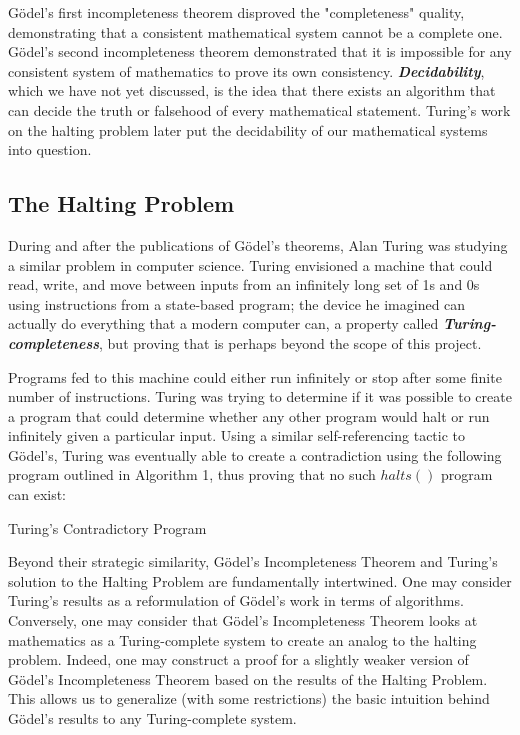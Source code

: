 \documentclass[conference]{IEEEtran}
\begin{document}
Gödel's first incompleteness theorem disproved the "completeness" quality, demonstrating that a consistent mathematical system cannot be a complete one. Gödel's second incompleteness theorem demonstrated that it is impossible for any consistent system of mathematics to prove its own consistency. \emph{\textbf{Decidability}}, which we have not yet discussed, is the idea that there exists an algorithm that can decide the truth or falsehood of every mathematical statement. Turing's work on the halting problem later put the decidability of our mathematical systems into question.

\subsection{The Halting Problem}
During and after the publications of Gödel's theorems, Alan Turing was studying a similar problem in computer science. Turing envisioned a machine that could read, write, and move between inputs from an infinitely long set of 1s and 0s using instructions from a state-based program; the device he imagined can actually do everything that a modern computer can, a property called \emph{\textbf{Turing-completeness}}, but proving that is perhaps beyond the scope of this project.

Programs fed to this machine could either run infinitely or stop after some finite number of instructions. Turing was trying to determine if it was possible to create a program that could determine whether any other program would halt or run infinitely given a particular input. Using a similar self-referencing tactic to Gödel's, Turing was eventually able to create a contradiction using the following program outlined in Algorithm 1, thus proving that no such $halts()$ program can exist: 

\begin{algorithm}[H]
\begin{algorithmic}
\caption{Turing's Contradictory Program}\label{alg:cap}
\Else
\EndIf
\end{algorithmic}
\end{algorithm}

Beyond their strategic similarity, Gödel's Incompleteness Theorem and Turing's solution to the Halting Problem are fundamentally intertwined. One may consider Turing's results as a reformulation of Gödel's work in terms of algorithms. Conversely, one may consider that Gödel's Incompleteness Theorem looks at mathematics as a Turing-complete system to create an analog to the halting problem. Indeed, one may construct a proof for a slightly weaker version of Gödel's Incompleteness Theorem based on the results of the Halting Problem. This allows us to generalize (with some restrictions) the basic intuition behind Gödel's results to any Turing-complete system.  
\end{document}
